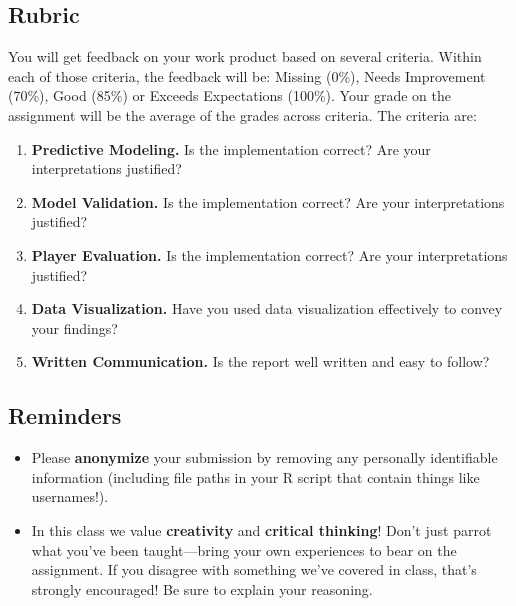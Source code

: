 \documentclass{article}
\begin{document}
    \subsection*{\sc Rubric}

      You will get feedback on your work product based on several criteria. Within each of those criteria, the feedback will be: Missing (0\%), Needs Improvement (70\%), Good (85\%) or Exceeds Expectations (100\%). Your grade on the assignment will be the average of the grades across criteria. The criteria are:
      \begin{enumerate}
        \item {\bf Predictive Modeling.} Is the implementation correct? Are your interpretations justified?
        \item {\bf Model Validation.} Is the implementation correct? Are your interpretations justified?
        \item {\bf Player Evaluation.} Is the implementation correct? Are your interpretations justified?
        \item {\bf Data Visualization.} Have you used data visualization effectively to convey your findings?
        \item {\bf Written Communication.} Is the report well written and easy to follow?
      \end{enumerate}

    \subsection*{\sc Reminders}

      \begin{itemize}
        \item Please {\bf anonymize} your submission by removing any personally identifiable information (including file paths in your R script that contain things like usernames!).
        \item In this class we value {\bf creativity} and {\bf critical thinking}! Don't just parrot what you've been taught---bring your own experiences to bear on the assignment. If you disagree with something we've covered in class, that's strongly encouraged! Be sure to explain your reasoning.
      \end{itemize}
\end{document}
